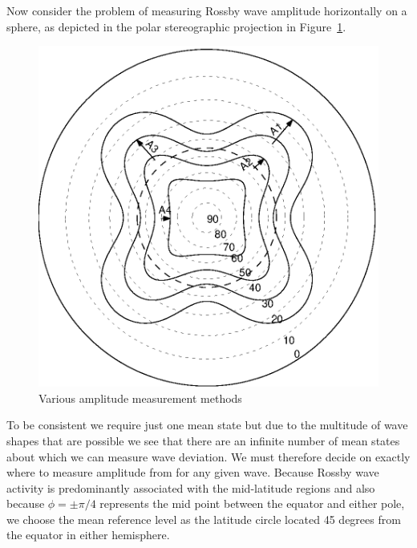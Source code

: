 Now consider the problem of measuring Rossby wave amplitude horizontally on a sphere, as depicted in the polar stereographic projection in Figure~\ref{fig:ampmeas}.
\begin{figure}[thbp]
	\centering
		\includegraphics[scale=0.85]{IMAGES/ampmeas.eps}
	\caption{Various amplitude measurement methods}
	\label{fig:ampmeas}
\end{figure} To be consistent we require just one mean state but due to the multitude of wave shapes that are possible we see that there are an infinite number of mean states about which we can measure wave deviation. We must therefore decide on exactly where to measure amplitude from for any given wave. Because Rossby wave activity is predominantly associated with the mid-latitude regions and also because $\phi=\pm \pi/4$ represents the mid point between the equator and either pole, we choose the mean reference level as the latitude circle located 45 degrees from the equator in either hemisphere.


